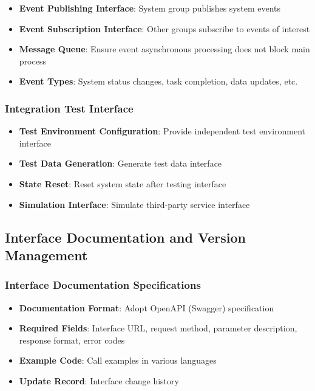 \documentclass[a4paper,12pt]{article}
\begin{document}
\begin{itemize}
  \item \textbf{Event Publishing Interface}: System group publishes system events
  \item \textbf{Event Subscription Interface}: Other groups subscribe to events of interest
  \item \textbf{Message Queue}: Ensure event asynchronous processing does not block main process
  \item \textbf{Event Types}: System status changes, task completion, data updates, etc.
\end{itemize}

\subsubsection{Integration Test Interface}

\begin{itemize}
  \item \textbf{Test Environment Configuration}: Provide independent test environment interface
  \item \textbf{Test Data Generation}: Generate test data interface
  \item \textbf{State Reset}: Reset system state after testing interface
  \item \textbf{Simulation Interface}: Simulate third-party service interface
\end{itemize}

\subsection{Interface Documentation and Version Management}

\subsubsection{Interface Documentation Specifications}

\begin{itemize}
  \item \textbf{Documentation Format}: Adopt OpenAPI (Swagger) specification
  \item \textbf{Required Fields}: Interface URL, request method, parameter description, response format, error codes
  \item \textbf{Example Code}: Call examples in various languages
  \item \textbf{Update Record}: Interface change history
\end{itemize}
\end{document}
